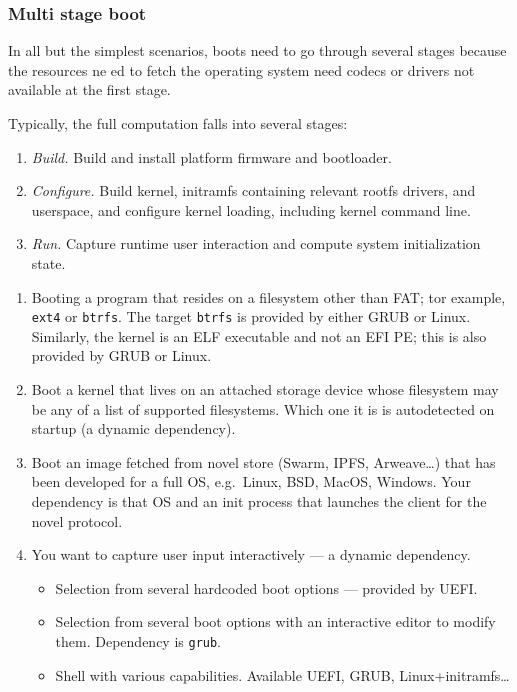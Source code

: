 \subsubsection{Multi stage boot}

In all but the simplest scenarios, boots need to go through several stages because the resources ne ed to fetch the operating system need codecs or drivers not available at the first stage.

Typically, the full computation falls into several stages:
\begin{enumerate}
  \item \emph{Build.} Build and install platform firmware and bootloader.
  \item \emph{Configure.} Build kernel, initramfs containing relevant rootfs drivers, and userspace, and configure kernel loading, including kernel command line.
  \item \emph{Run.} Capture runtime user interaction and compute system initialization state.
\end{enumerate}

\begin{enumerate}
  \item Booting a program that resides on a filesystem other than FAT; tor example, \texttt{ext4} or \texttt{btrfs}. 
  The target \texttt{btrfs} is provided by either GRUB or Linux.
  Similarly, the kernel is an ELF executable and not an EFI PE; this is also provided by GRUB or Linux. 
  
  \item Boot a kernel that lives on an attached storage device whose filesystem may be any of a list of supported filesystems. 
  Which one it is is autodetected on startup (a dynamic dependency). 
  
  \item Boot an image fetched from novel store (Swarm, IPFS, Arweave\ldots) that has been developed for a full OS, e.g.~Linux, BSD, MacOS, Windows. 
  Your dependency is that OS and an init process that launches the client for the novel protocol.
  
  \item 
    You want to capture user input interactively --- a dynamic dependency.
    \begin{itemize}
      \item Selection from several hardcoded boot options --- provided by UEFI.
      \item Selection from several boot options with an interactive editor to modify them. Dependency is \texttt{grub}.
      \item Shell with various capabilities. Available UEFI, GRUB, Linux+initramfs\ldots{} 
    \end{itemize}
    


\end{enumerate}

